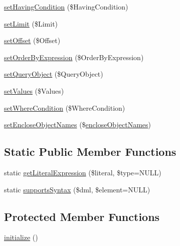 \begin{DoxyCompactItemize}
\item 
\hyperlink{class_able_polecat___query_language___statement_abstract_a6ecd27a25e1ed7dcb96756fb6ef1a672}{set\+Having\+Condition} (\$Having\+Condition)
\item 
\hyperlink{class_able_polecat___query_language___statement_abstract_acda5800b21cda970d6559c34cee6aa85}{set\+Limit} (\$Limit)
\item 
\hyperlink{class_able_polecat___query_language___statement_abstract_a2a5eb959d78f45beb5c4208b2589717c}{set\+Offset} (\$Offset)
\item 
\hyperlink{class_able_polecat___query_language___statement_abstract_a8be6e2f31d531ec85b66febb8d71abbf}{set\+Order\+By\+Expression} (\$Order\+By\+Expression)
\item 
\hyperlink{class_able_polecat___query_language___statement_abstract_a0d5397c92a584fa902625df534ab52ac}{set\+Query\+Object} (\$Query\+Object)
\item 
\hyperlink{class_able_polecat___query_language___statement_abstract_aa4738b204583a759c2e9a243fd3894df}{set\+Values} (\$Values)
\item 
\hyperlink{class_able_polecat___query_language___statement_abstract_a29c53cb0ce1336f15ae9a4afc3923168}{set\+Where\+Condition} (\$Where\+Condition)
\item 
\hyperlink{class_able_polecat___query_language___statement_abstract_a47ab24326a09d971e827060786264042}{set\+Enclose\+Object\+Names} (\$\hyperlink{class_able_polecat___query_language___statement_abstract_a1267392dd4d0f632a802b47d3710b500}{enclose\+Object\+Names})
\end{DoxyCompactItemize}
\subsection*{Static Public Member Functions}
\begin{DoxyCompactItemize}
\item 
static \hyperlink{class_able_polecat___query_language___statement_abstract_a7e8b7ade103075378490c24d61b098bd}{get\+Literal\+Expression} (\$literal, \$type=N\+U\+L\+L)
\item 
static \hyperlink{class_able_polecat___query_language___statement_abstract_adde2717fdf822a3d83fed451a50c5ece}{supports\+Syntax} (\$dml, \$element=N\+U\+L\+L)
\end{DoxyCompactItemize}
\subsection*{Protected Member Functions}
\begin{DoxyCompactItemize}
\item 
\hyperlink{class_able_polecat___query_language___statement_abstract_a91098fa7d1917ce4833f284bbef12627}{initialize} ()
\end{DoxyCompactItemize}
